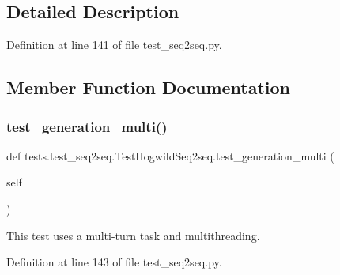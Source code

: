 \subsection{Detailed Description}


Definition at line 141 of file test\+\_\+seq2seq.\+py.



\subsection{Member Function Documentation}
\mbox{\label{classtests_1_1test__seq2seq_1_1TestHogwildSeq2seq_ae5d33c237b20de2e7bbe59058c181f38}} 
\subsubsection{\texorpdfstring{test\+\_\+generation\+\_\+multi()}{test\_generation\_multi()}}
{\footnotesize\ttfamily def tests.\+test\+\_\+seq2seq.\+Test\+Hogwild\+Seq2seq.\+test\+\_\+generation\+\_\+multi (\begin{DoxyParamCaption}\item[{}]{self }\end{DoxyParamCaption})}

\begin{DoxyVerb}This test uses a multi-turn task and multithreading.
\end{DoxyVerb}
 

Definition at line 143 of file test\+\_\+seq2seq.\+py.


